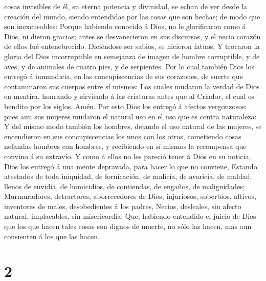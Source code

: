 cosas invisibles de él, su eterna potencia y divinidad, se echan de ver
desde la creación del mundo, siendo entendidas por las cosas que son
hechas; de modo que son inexcusables:  Porque habiendo
conocido á Dios, no le glorificaron como á Dios, ni dieron gracias;
antes se desvanecieron en sus discursos, y el necio corazón de ellos fué
entenebrecido.  Diciéndose ser sabios, se hicieron
fatuos,  Y trocaron la gloria del Dios incorruptible en
semejanza de imagen de hombre corruptible, y de aves, y de animales de
cuatro pies, y de serpientes.  Por lo cual también Dios
los entregó á inmundicia, en las concupiscencias de sus corazones, de
suerte que contaminaron sus cuerpos entre sí mismos:  Los
cuales mudaron la verdad de Dios en mentira, honrando y sirviendo á las
criaturas antes que al Criador, el cual es bendito por los siglos. Amén.
 Por esto Dios los entregó á afectos vergonzosos; pues
aun sus mujeres mudaron el natural uso en el uso que es contra
naturaleza:  Y del mismo modo también los hombres,
dejando el uso natural de las mujeres, se encendieron en sus
concupiscencias los unos con los otros, cometiendo cosas nefandas
hombres con hombres, y recibiendo en sí mismos la recompensa que convino
á su extravío.  Y como á ellos no les pareció tener á
Dios en su noticia, Dios los entregó á una mente depravada, para hacer
lo que no conviene,  Estando atestados de toda iniquidad,
de fornicación, de malicia, de avaricia, de maldad; llenos de envidia,
de homicidios, de contiendas, de engaños, de malignidades;
 Murmuradores, detractores, aborrecedores de Dios,
injuriosos, soberbios, altivos, inventores de males, desobedientes á los
padres,  Necios, desleales, sin afecto natural,
implacables, sin misericordia:  Que, habiendo entendido
el juicio de Dios que los que hacen tales cosas son dignos de muerte, no
sólo las hacen, mas aun consienten á los que las hacen.

\hypertarget{section-1}{%
\section{2}\label{section-1}}

